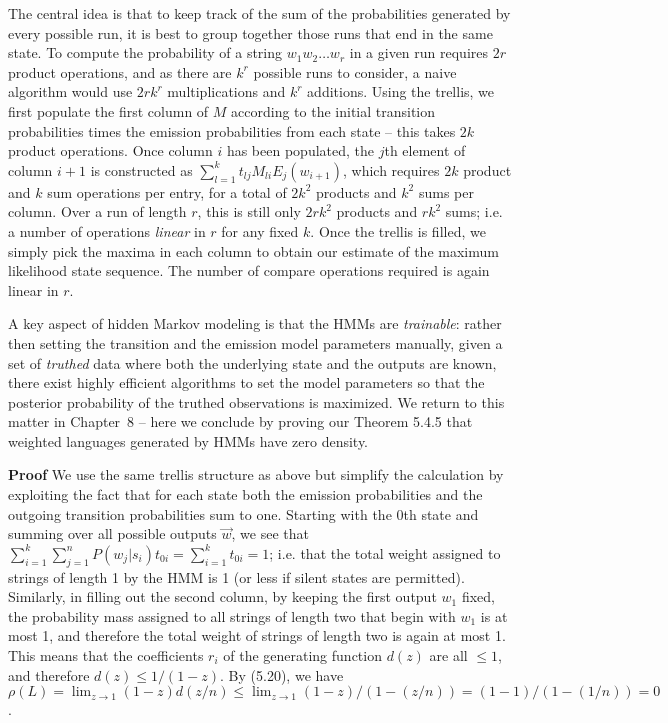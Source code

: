 The central idea is that to keep track of the sum of the probabilities
generated by every possible run, it is best to group together those runs that
end in the same state. To compute the probability of a string $w_1w_2\ldots
w_r$ in a given run requires $2r$ product operations, and as there are $k^r$
possible runs to consider, a naive algorithm would use $2rk^r$ multiplications
and $k^r$ additions. Using the trellis, we first populate the first column of
$M$ according to the initial transition probabilities times the emission
probabilities from each state -- this takes $2k$ product operations. Once 
column $i$ has been populated, the $j$th element of column $i+1$ is
constructed as $\sum_{l=1}^k t_{lj}M_{li}E_j(w_{i+1})$, which requires $2k$
product and $k$ sum operations per entry, for a total of $2k^2$ products and
$k^2$ sums per column. Over a run of length $r$, this is still only $2rk^2$
products and $rk^2$ sums; i.e. a number of operations {\it linear} in $r$ for
any fixed $k$. Once the trellis is filled, we simply pick the maxima in 
each column to obtain our estimate of the maximum likelihood state sequence.
The number of compare operations required is again linear in $r$. 

A key aspect of hidden Markov modeling is that the HMMs are {\it trainable}:
rather then setting the transition and the emission model parameters manually,
given a set of {\it truthed} data where both the
underlying state and the outputs are known, there exist highly efficient
algorithms to set the model parameters so that the posterior probability of
the truthed observations is maximized. We return to this matter in Chapter~8
-- here we conclude by proving our Theorem 5.4.5 that weighted languages
generated by HMMs have zero density. 

\smallskip
\noindent
{\bf Proof} We use the same trellis structure as above but simplify the
calculation by exploiting the fact that for each state both the emission
probabilities and the outgoing transition probabilities sum to one. Starting
with the $0$th state and summing over all possible outputs $\vec{w}$, we see
that $\sum_{i=1}^k \sum_{j=1}^n P(w_j|s_i)t_{0i}=\sum_{i=1}^k t_{0i}=1$;
i.e. that the total weight assigned to strings of length 1 by the HMM is 1 (or
less if silent states are permitted). Similarly, in filling out the second
column, by keeping the first output $w_1$ fixed, the probability mass assigned
to all strings of length two that begin with $w_1$ is at most 1, and therefore
the total weight of strings of length two is again at most 1. This means that
the coefficients $r_i$ of the generating function $d(z)$ are all $\leq 1$, and
therefore $d(z)\leq 1/(1-z)$. By (5.20), we have $\rho(L) = \lim_{z
  \rightarrow 1} (1-z)d(z/n) \leq \lim_{z \rightarrow 1} (1-z)/(1-(z/n))=
(1-1)/(1-(1/n))=0$.

